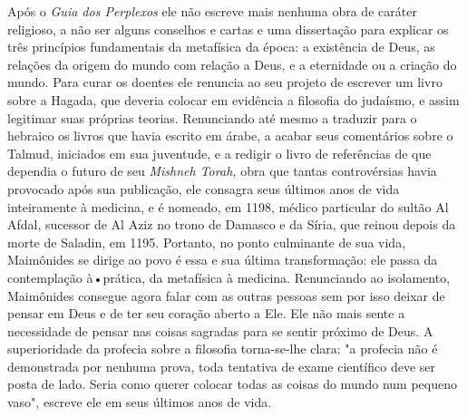 \begin{itemize}
\begin{enumrate}
Após o \emph{Guia dos Perplexos} ele não escreve mais nenhuma obra de
caráter religioso, a não ser alguns conselhos e cartas e uma dissertação
para ex­plicar os três princípios fundamentais da metafísica da época: a
existência de Deus, as relações da origem do mundo com relação a Deus, e
a eternidade ou a criação do mundo. Para curar os doentes ele renuncia
ao seu projeto de es­crever um livro sobre a Hagada, que deveria colocar
em evidência a filosofia do judaísmo, e assim legitimar suas próprias
teorias. Renunciando até mesmo a traduzir para o hebraico os livros que
havia escrito em árabe, a acabar seus comentários sobre o Talmud,
iniciados em sua juventude, e a redigir o livro de referências de que
dependia o futuro de seu \emph{Mishneh Torah,} obra que tan­tas
controvérsias havia provocado após sua publicação, ele consagra seus
últi­mos anos de vida inteiramente à medicina, e é nomeado, em 1198,
médico par­ticular do sultão Al Afdal, sucessor de Al Aziz no trono de
Damasco e da Síria, que reinou depois da morte de Saladin, em 1195.
Portanto, no ponto culmi­nante de sua vida, Maimônides se dirige ao povo
é essa e sua última transforma­ção: ele passa da contemplação à•prática,
da metafísica à medicina. Renuncian­do ao isolamento, Maimônides
consegue agora falar com as outras pessoas sem por isso deixar de pensar
em Deus e de ter seu coração aberto a Ele. Ele não mais sente a
necessidade de pensar nas coisas sagradas para se sentir próximo de
Deus. A superioridade da profecia sobre a filosofia torna-se-lhe clara:
"a pro­fecia não é demonstrada por nenhuma prova, toda tentativa de
exame científi­co deve ser posta de lado. Seria como querer colocar
todas as coisas do mundo num pequeno vaso", escreve ele em seus últimos
anos de vida.


\end{enumrate}
\end{itemize}
